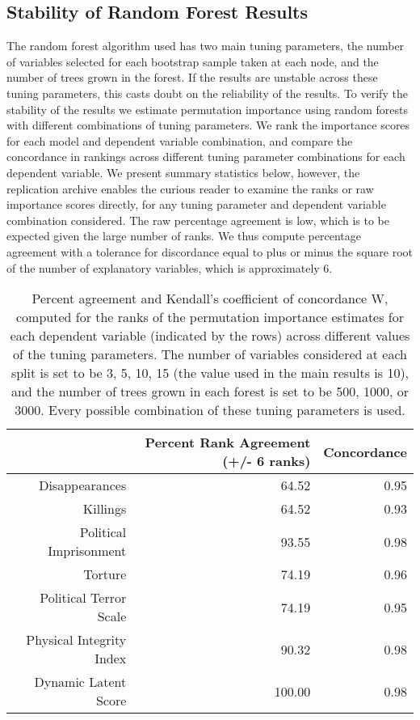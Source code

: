 \documentclass[11pt]{article}
\begin{document}
\subsection{Stability of Random Forest Results}

The random forest algorithm used has two main tuning parameters, the number of variables selected for each bootstrap sample taken at each node, and the number of trees grown in the forest. If the results are unstable across these tuning parameters, this casts doubt on the reliability of the results. To verify the stability of the results we estimate permutation importance using random forests with different combinations of tuning parameters. We rank the importance scores for each model and dependent variable combination, and compare the concordance in rankings across different tuning parameter combinations for each dependent variable. We present summary statistics below, however, the replication archive enables the curious reader to examine the ranks or raw importance scores directly, for any tuning parameter and dependent variable combination considered. The raw percentage agreement is low, which is to be expected given the large number of ranks. We thus compute percentage agreement with a tolerance for discordance equal to plus or minus the square root of the number of explanatory variables, which is approximately 6.

\begin{table}[ht]
\centering
\begin{tabular}{rrr}
  \hline
 & Percent Rank Agreement (+/- 6 ranks) & Concordance \\ 
  \hline
Disappearances & 64.52 & 0.95 \\ 
  Killings & 64.52 & 0.93 \\ 
  Political Imprisonment & 93.55 & 0.98 \\ 
  Torture & 74.19 & 0.96 \\ 
  Political Terror Scale & 74.19 & 0.95 \\ 
  Physical Integrity Index & 90.32 & 0.98 \\ 
  Dynamic Latent Score & 100.00 & 0.98 \\ 
  \hline
\end{tabular}
\caption{Percent agreement and Kendall's coefficient of concordance W, computed for the ranks of the permutation importance estimates for each dependent variable (indicated by the rows) across different values of the tuning parameters. The number of variables considered at each split is set to be 3, 5, 10, 15 (the value used in the main results is 10), and the number of trees grown in each forest is set to be 500, 1000, or 3000. Every possible combination of these tuning parameters is used.}
\end{table}
\end{document}
